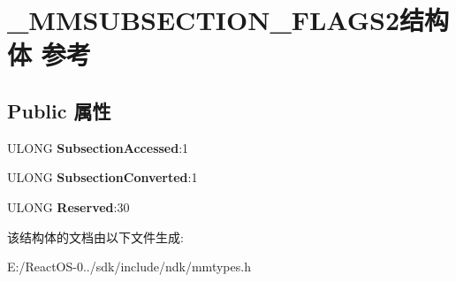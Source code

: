\hypertarget{struct___m_m_s_u_b_s_e_c_t_i_o_n___f_l_a_g_s2}{}\section{\+\_\+\+M\+M\+S\+U\+B\+S\+E\+C\+T\+I\+O\+N\+\_\+\+F\+L\+A\+G\+S2结构体 参考}
\label{struct___m_m_s_u_b_s_e_c_t_i_o_n___f_l_a_g_s2}
\subsection*{Public 属性}
\begin{DoxyCompactItemize}
\item 
\mbox{\label{struct___m_m_s_u_b_s_e_c_t_i_o_n___f_l_a_g_s2_a3483468e944098b43e66c27472322b26}} 
U\+L\+O\+NG {\bfseries Subsection\+Accessed}\+:1
\item 
\mbox{\label{struct___m_m_s_u_b_s_e_c_t_i_o_n___f_l_a_g_s2_a147a393d07b995440b893186dd5cee4d}} 
U\+L\+O\+NG {\bfseries Subsection\+Converted}\+:1
\item 
\mbox{\label{struct___m_m_s_u_b_s_e_c_t_i_o_n___f_l_a_g_s2_a041e2ab2568d05aa1fb2736c8de1979d}} 
U\+L\+O\+NG {\bfseries Reserved}\+:30
\end{DoxyCompactItemize}


该结构体的文档由以下文件生成\+:\begin{DoxyCompactItemize}
\item 
E\+:/\+React\+O\+S-\/0../sdk/include/ndk/mmtypes.\+h\end{DoxyCompactItemize}
